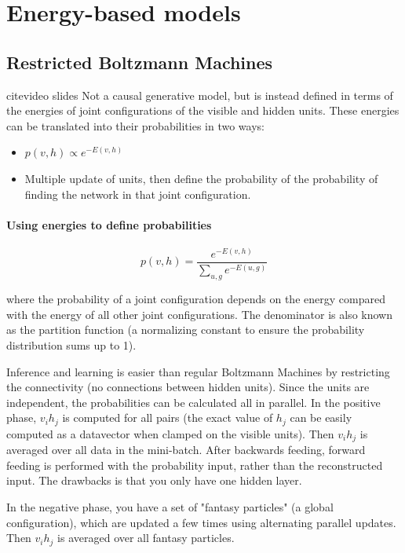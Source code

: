 \documentclass{report}
\begin{document}
\section{Energy-based models}

\subsection{Restricted Boltzmann Machines}	
cite{video slides}
Not a causal generative model, but is instead defined in terms of the energies of joint configurations of the visible and hidden units. These energies can be translated into their probabilities in two ways: 
\begin{itemize}
	\item $p(v, h) \propto e^{-E(v, h)}$
	\item Multiple update of units, then define the probability of the probability of finding the network in that joint configuration.
\end{itemize}

\paragraph{Using energies to define probabilities}
\begin{equation}
p(v, h) = \frac{e^{-E(v, h)}}{\displaystyle\sum_{u, g}e^{-E(u, g)}}
\end{equation}

where the probability of a joint configuration depends on the energy compared with the energy of all other joint configurations. The denominator is also known as the partition function (a normalizing constant to ensure the probability distribution sums up to 1).

Inference and learning is easier than regular Boltzmann Machines by restricting the connectivity (no connections between hidden units). Since the units are independent, the probabilities can be calculated all in parallel. In the positive phase, $v_i h_j$ is computed for all pairs (the exact value of $h_j$ can be easily computed as a datavector when clamped on the visible units). Then $v_i h_j$ is averaged over all data in the mini-batch. After backwards feeding, forward feeding is performed with the probability input, rather than the reconstructed input. The drawbacks is that you only have one hidden layer.

In the negative phase, you have a set of "fantasy particles" (a global configuration), which are updated a few times using alternating parallel updates. Then $v_i h_j$ is averaged over all fantasy particles.
\end{document}
